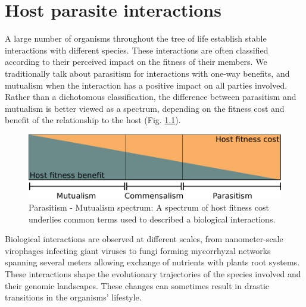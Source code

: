 
\chapter{Host parasite interactions} %

\label{ch:01-01} %


A large number of organisms throughout the tree of life establish stable interactions with different species. These interactions are often classified according to their perceived impact on the fitness of their members. We traditionally talk about parasitism for interactions with one-way benefits, and mutualism when the interaction has a positive impact on all parties involved. Rather than a dichotomous classification, the difference between parasitism and mutualism is better viewed as a spectrum, depending on the \Gls{fitness} cost and benefit of the relationship to the host (Fig. \ref{fig:01-01:mutualism}).

\begin{figure}[b]
    \includegraphics[width=\textwidth]{Parts/Part01/gfx/parasitism_mutualism.pdf}
    \caption{Parasitism - Mutualism spectrum: A spectrum of host \Gls{fitness} cost underlies common terms used to described a biological interactions.}
	\label{fig:01-01:mutualism}
\end{figure}

Biological interactions are observed at different scales, from nanometer-scale virophages infecting giant viruses to fungi forming mycorrhyzal networks spanning several meters \citep{johnsonFunctioningMycorrhizalAssociations1997,selosseMycorrhizalNetworksLiaisons2006} allowing exchange of nutrients with plants root systems. These interactions shape the evolutionary trajectories of the species involved and their genomic landscapes. These changes can sometimes result in drastic transitions in the organisms' lifestyle. 

